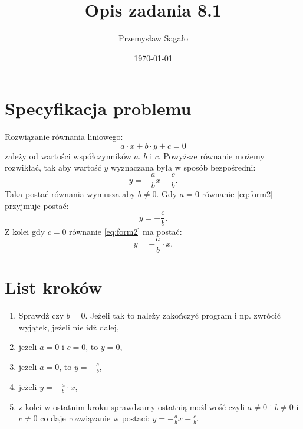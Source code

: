 \documentclass[a4paper]{article}
\title{Opis zadania 8.1}
\author{Przemysław Sagało}
\date{\today}
\begin{document}
\maketitle
\section{Specyfikacja problemu}   
Rozwiązanie równania liniowego:
\begin{equation}
a \cdot x + b \cdot y+c = 0 
\end{equation} 
zależy od wartości współczynników $a$, $b$ i $c$.
Powyższe równanie możemy rozwikłać, tak aby wartość $y$ wyznaczana była w sposób bezpośredni:
\begin{equation}
\label{eq:form2}
y = - \frac{a}{b} x - \frac{c}{b}.
\end{equation}
Taka postać równania wymusza aby $b \neq 0$.
\newline
Gdy $a=0$ równanie \ref{eq:form2} przyjmuje postać:
\begin{equation}
y = - \frac{c}{b}.
\end{equation}
Z kolei gdy $c=0$ równanie \ref{eq:form2} ma postać:
\begin{equation}
y = - \frac{a}{b} \cdot x.
\end{equation}

\section{List kroków}
\begin{enumerate}
\item Sprawdź czy $b=0$. Jeżeli tak to należy zakończyć program i np. zwrócić wyjątek, jeżeli nie idź dalej,
\item jeżeli $a=0$ i $c=0$, to $y=0$,
\item jeżeli $a=0$, to $y = - \frac{c}{b}$,
\item jeżeli $y = - \frac{a}{b} \cdot x$,
\item z kolei w ostatnim kroku sprawdzamy ostatnią możliwość czyli $a \neq 0$ i $b \neq 0$ i $c \neq 0$ co daje rozwiązanie w postaci: $y = - \frac{a}{b} x - \frac{c}{b}$.
\end{enumerate}
\end{document}
